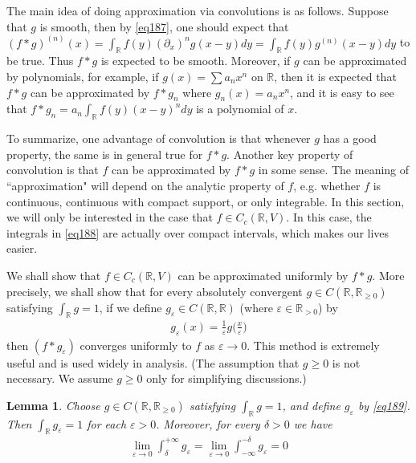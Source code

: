 \documentclass[12pt,b5paper,notitlepage]{article}
\theoremstyle{definition}
\theoremstyle{plain}
\newtheorem{lm}[df]{Lemma}
\newcommand{\Rbb}{\mathbb R}
\newcommand{\eps}{\varepsilon}
\numberwithin{equation}{section}
\begin{document}
The main idea of doing approximation via convolutions is as follows. Suppose that $g$ is smooth, then by \eqref{eq187}, one should expect that $(f*g)^{(n)}(x)=\int_\Rbb f(y)(\partial_x)^ng(x-y)dy=\int_\Rbb f(y)g^{(n)}(x-y)dy$ to be true. Thus $f*g$ is expected to be smooth. Moreover, if $g$ can be approximated by polynomials, for example, if $g(x)=\sum a_nx^n$ on $\Rbb$, then it is expected that $f*g$ can be approximated by $f*g_n$ where $g_n(x)=a_nx^n$, and it is easy to see that $f*g_n=a_n\int_\Rbb f(y)(x-y)^ndy$ is a polynomial of $x$.

To summarize, one advantage of convolution is that whenever $g$ has a good property, the same is in general true for $f*g$. Another key property of convolution is that $f$ can be approximated by $f*g$ in some sense. The meaning of ``approximation" will depend on the analytic property of $f$, e.g. whether $f$ is continuous, continuous with compact support, or only integrable. In this section, we will only be interested in the case that $f\in C_c(\Rbb,V)$. In this case, the integrals in \eqref{eq188} are actually over compact intervals, which makes our lives easier. 

We shall show that $f\in C_c(\Rbb,V)$ can be approximated uniformly by $f*g$. More precisely, we shall show that for every absolutely convergent $g\in C(\Rbb,\Rbb_{\geq0})$ satisfying $\int_\Rbb g=1$, if we define $g_\eps\in C(\Rbb,\Rbb)$ (where $\eps\in\Rbb_{>0}$) by
\begin{align}
g_\eps(x)=\frac 1\eps g\big(\frac x\eps\big)  \label{eq189}
\end{align}
then $(f*g_\eps)$ converges uniformly to $f$ as $\eps\rightarrow 0$. This method is extremely useful and is used widely in analysis. (The assumption that $g\geq0$ is not necessary. We assume $g\geq0$ only for simplifying discussions.)








\begin{lm}\label{lb436}
Choose $g\in C(\Rbb,\Rbb_{\geq0})$ satisfying $\int_\Rbb g=1$, and define $g_\eps$ by \eqref{eq189}. Then $\int_\Rbb g_\eps=1$ for each $\eps>0$. Moreover, for every $\delta>0$ we have
\begin{align}
\lim_{\eps\rightarrow0}\int_\delta^{+\infty} g_\eps=\lim_{\eps\rightarrow0}\int_{-\infty}^{-\delta}g_\eps=0 \label{eq190}
\end{align}
\end{lm}
\end{document}
